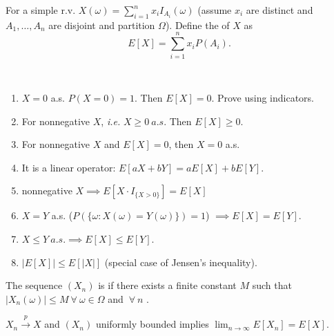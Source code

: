 \documentclass[class=article,crop=false]{standalone}
\begin{document}
\begin{defn}
	For a simple r.v. $ X(\omega)=\sum_{ i= 1}^{ n} x_i I_{A_i}(\omega)$ (assume $ x_i$ are distinct and $ A_1,\ldots,A_n$ are disjoint and partition $ \Omega$). Define the  of $ X$ as
	 \[
		 E[X] = \sum_{ i= 1}^{ n} x_i P(A_i)
	.\] 
\end{defn}
\begin{property}
	~\begin{enumerate}[label=\arabic*)]
		\item $ X=0$ a.s.  $ P(X=0)=1$. Then  $ E[X]=0$. Prove using indicators.
		\item For nonnegative $ X$, \emph{i.e.} $ X \geq 0 \ a.s.$ Then $ E[X]\geq 0$.
		\item  For nonnegative $ X$ and  $ E[X]=0$, then  $ X=0$ a.s.
		\item It is a linear operator:  $ E[aX+bY] = aE[X]+bE[Y]$.
		\item  nonnegative $ X \implies E[X \cdot I_{\{X>0\} }] = E[X]$ 
		\item $ X=Y$ a.s. ($ P(\{\omega: X(\omega)=Y(\omega)\} )=1$) $ \implies E[X]=E[Y]$.
		\item $ X\leq Y \ a.s. \implies E[X]\leq E[Y]$.
		\item $ |E[X]|\leq E[|X|]$ (special case of Jensen's inequality).
	\end{enumerate}
\end{property}
\begin{defn}
	The sequence $ (X_n)$ is  if there exists a finite constant  $ M$  such that $ |X_n(\omega)| \leq M \ \forall \ \omega \in \Omega$ and $ \ \forall \ n$ . 
\end{defn}
\begin{thm}[]
	$ X_n \xrightarrow{ p}  X$ and $ (X_n) $ uniformly bounded implies $ \lim_{ n \to \infty} E[X_n]=E[X]$.
\end{thm}
\end{document}
